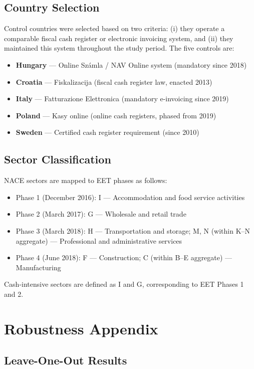 \documentclass[12pt]{article}
\begin{document}
\subsection{Country Selection}

Control countries were selected based on two criteria: (i) they operate a comparable fiscal cash register or electronic invoicing system, and (ii) they maintained this system throughout the study period. The five controls are:

\begin{itemize}
\item \textbf{Hungary} --- Online Számla / NAV Online system (mandatory since 2018)
\item \textbf{Croatia} --- Fiskalizacija (fiscal cash register law, enacted 2013)
\item \textbf{Italy} --- Fatturazione Elettronica (mandatory e-invoicing since 2019)
\item \textbf{Poland} --- Kasy online (online cash registers, phased from 2019)
\item \textbf{Sweden} --- Certified cash register requirement (since 2010)
\end{itemize}

\subsection{Sector Classification}

NACE sectors are mapped to EET phases as follows:
\begin{itemize}
\item Phase 1 (December 2016): I --- Accommodation and food service activities
\item Phase 2 (March 2017): G --- Wholesale and retail trade
\item Phase 3 (March 2018): H --- Transportation and storage; M, N (within K--N aggregate) --- Professional and administrative services
\item Phase 4 (June 2018): F --- Construction; C (within B--E aggregate) --- Manufacturing
\end{itemize}

Cash-intensive sectors are defined as I and G, corresponding to EET Phases 1 and 2.

\section{Robustness Appendix}

\subsection{Leave-One-Out Results}
\end{document}
